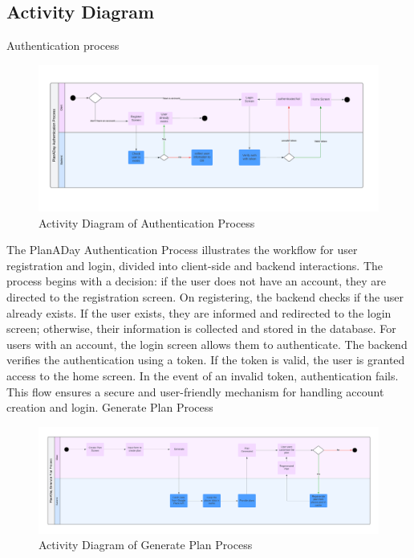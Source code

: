 \newpage
\subsection{Activity Diagram}
Authentication process
\begin{figure}[!h]
    \centering
    \includegraphics[width=1\linewidth]{chapter3/authentication-process.png}
    \caption{Activity Diagram of Authentication Process}
    \label{fig:Activity Diagram of Authentication Process}
\end{figure}
\par
The PlanADay Authentication Process illustrates the workflow for user registration and login,
divided into client-side and backend interactions. The process begins with a decision: if the user
does not have an account, they are directed to the registration screen. On registering, the backend
checks if the user already exists. If the user exists, they are informed and redirected to the login
screen; otherwise, their information is collected and stored in the database. For users with an
account, the login screen allows them to authenticate. The backend verifies the authentication
using a token. If the token is valid, the user is granted access to the home screen. In the event of
an invalid token, authentication fails. This flow ensures a secure and user-friendly mechanism
for handling account creation and login.
\newpage
Generate Plan Process
\begin{figure}[!h]
    \centering
    \includegraphics[width=1\linewidth]{chapter3/generate-process.png}
    \caption{Activity Diagram of Generate Plan Process}
    \label{fig:Activity Diagram of Generate Plan Process}
\end{figure}
